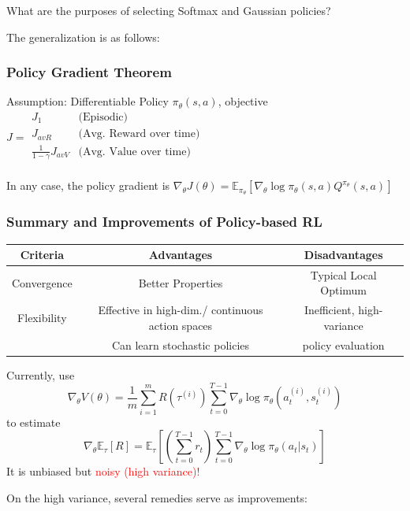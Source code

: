 \documentclass{article}
\begin{document}
\begin{hintbox}
    What are the purposes of selecting Softmax and Gaussian policies?
\end{hintbox}

The generalization is as follows:
\begin{thmbox}
    \subsubsection*{Policy Gradient Theorem}
    Assumption: Differentiable Policy $\pi_{\theta}(s, a)$, objective $J = 
    \begin{aligned}
        J_1 & \text{(Episodic)} \\
        J_{avR} & \text{(Avg. Reward over time)} \\
        \frac{1}{1 - \gamma} J_{avV} & \text{(Avg. Value over time)} \\
    \end{aligned}$
    
    In any case, the policy gradient is 
    $\nabla_{\theta} J(\theta) = \mathbb{E}_{\pi_{\theta}} \left[ \nabla_{\theta} \log \pi_{\theta} (s, a) Q^{\pi_{\theta}} (s, a)\right]$
\end{thmbox}

\subsubsection*{Summary and Improvements of Policy-based RL}
\begin{center}
    \begin{tabular}{|c||c|c|}
    \hline
    Criteria & Advantages & Disadvantages \\ \hline
    Convergence & Better Properties & Typical Local Optimum \\ \hline
    Flexibility & Effective in high-dim./ continuous action spaces & Inefficient, high-variance \\ 
    & Can learn stochastic policies & policy evaluation \\ \hline
    \end{tabular}
\end{center}

\begin{defbox}
    Currently, use
    \begin{equation*}
        \nabla_{\theta} V(\theta) = \frac{1}{m} \sum_{i = 1}^{m} R(\tau^{(i)}) \sum_{t = 0}^{T-1} \nabla_{\theta} \log \pi_{\theta} (a_t^{(i)}, s_t^{(i)})
    \end{equation*}
    to estimate
    \begin{equation*}
        \nabla_{\theta} \mathbb{E}_{\tau} [R] = \mathbb{E}_{\tau} \left[ \left(\sum_{t = 0}^{T-1} r_{t} \right) \sum_{t=0}^{T-1} \nabla_{\theta} \log \pi_{\theta} (a_t | s_t) \right]
    \end{equation*}
    It is unbiased but \textcolor{red}{noisy (high variance)!}
\end{defbox}
On the high variance, several remedies serve as improvements:
\end{document}
